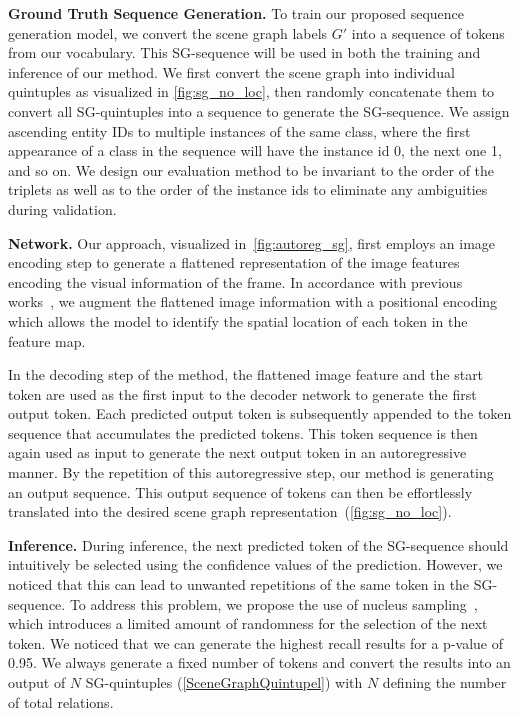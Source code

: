 \documentclass[10pt,twocolumn,letterpaper]{article}
\begin{document}
\noindent\textbf{Ground Truth Sequence Generation.} 
To train our proposed sequence generation model, we convert the scene graph labels $G'$ into a sequence of tokens from our vocabulary. This SG-sequence will be used in both the training and inference of our method.
We first convert the scene graph into individual quintuples as visualized in \cref{fig:sg_no_loc}, then randomly concatenate them to convert all SG-quintuples into a sequence to generate the SG-sequence. We assign ascending entity IDs to multiple instances of the same class, where the first appearance of a class in the sequence will have the instance id 0, the next one 1, and so on. We design our evaluation method to be invariant to the order of the triplets as well as to the order of the instance ids to eliminate any ambiguities during validation.

\noindent\textbf{Network.} Our approach, visualized in~\cref{fig:autoreg_sg}, first employs an image encoding step to generate a flattened representation of the image features encoding the visual information of the frame. In accordance with previous works~\cite{chen_pix2seq_2022}, we augment the flattened image information with a positional encoding which allows the model to identify the spatial location of each token in the feature map.

In the decoding step of the method, the flattened image feature and the start token are used as the first input to the decoder network to generate the first output token. Each predicted output token is subsequently appended to the token sequence that accumulates the predicted tokens. This token sequence is then again used as input to generate the next output token in an autoregressive manner. By the repetition of this autoregressive step, our method is generating an output sequence. This output sequence of tokens can then be effortlessly translated into the desired scene graph representation~(\cref{fig:sg_no_loc}).

\noindent\textbf{Inference.} 
During inference, the next predicted token of the SG-sequence should intuitively be selected using the confidence values of the prediction. However, we noticed that this can lead to unwanted repetitions of the same token in the SG-sequence. To address this problem, we propose the use of nucleus sampling~\cite{holtzman_curious_2020}, which introduces a limited amount of randomness for the selection of the next token. We noticed that we can generate the highest recall results for a p-value of 0.95. We always generate a fixed number of tokens and convert the results into an output of $N$ SG-quintuples (\cref{SceneGraphQuintupel}) with $N$ defining the number of total relations.
\end{document}
